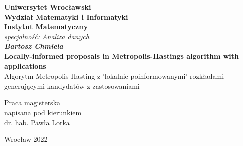 \thispagestyle{empty}
\begin{center}
	\textbf{\large Uniwersytet Wroc\l{}awski\\
		Wydzia\l{} Matematyki i Informatyki\\
		Instytut Matematyczny}\\
	\textit{\large specjalno\'{s}\'{c}: Analiza danych}\\
	\vspace{4cm}
	\textbf{\textit{\large Bartosz Chmiela}\\
		\vspace{0.5cm}
		{\Large Locally-informed proposals in Metropolis-Hastings algorithm with applications}}\\
		\vspace{0.5cm}
		Algorytm Metropolis-Hasting z 'lokalnie-poinformowanymi' rozkładami generującymi kandydatów z zastosowaniami
\end{center}
\vspace{3cm}
{\large \hspace*{6.5cm}Praca magisterska\\
	\hspace*{6.5cm}napisana pod kierunkiem\\
	\hspace*{6.5cm}dr. hab. Paw\l{}a Lorka }\\
\vfill
\begin{center}
	{\large Wroc\l{}aw 2022}\\
\end{center}